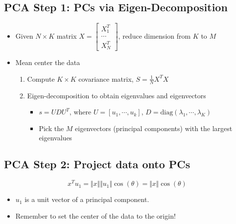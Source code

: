 \documentclass[10pt]{article}
\begin{document}
\subsection*{PCA Step 1: PCs via Eigen-Decomposition}
\begin{itemize}
	\item Given $N \times K$ matrix $X = \begin{bmatrix} X_1^T \\ \cdots \\ X_N^T \end{bmatrix}$, reduce dimension from $K$ to $M$
	\item Mean center the data
	\begin{enumerate}
	    \item Compute $K \times K$ covariance matrix, $S = \frac{1}{N} X^T X$
	    \item Eigen-decomposition to obtain eigenvalues and eigenvectors
	    \begin{itemize}
	        \item $s = UDU^T$, where $U = [u_1, \cdots, u_k]$, $D = \text{diag}(\lambda_1, \cdots, \lambda_K)$
	        \item Pick the $M$ eigenvectors (principal components) with the largest eigenvalues
        \end{itemize}
    \end{enumerate}
\end{itemize}

\subsection*{PCA Step 2: Project data onto PCs}
\[x^T u_1 = \Vert x\Vert \Vert u_1 \Vert \cos(\theta) = \Vert x \Vert \cos(\theta)\]
\begin{itemize}
	\item $u_1$ is a unit vector of a principal component.
	\item Remember to set the center of the data to the origin!
\end{itemize}
\end{document}
